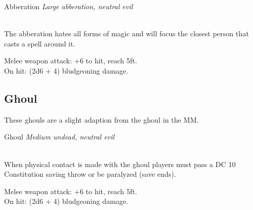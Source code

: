 \documentclass[10pt,twoside,twocolumn]{article}
\begin{document}
\begin{monsterbox}{Abberation}
	\textit{Large abberation, neutral evil}\\
	\hline
	\basics[%
	armorclass = 16,
	hitpoints  = 93 (11d10 + 33),
	speed      = 20 ft
	]
	\hline
	\stats[
	STR = 19 (+4),
	DEX = 10 (0),
	CON = 16 (+3),
	INT = 5 (-3),
	WIS = 11 (0),
	CHA = 5 (-3)
	]
	\hline
	\details[%
	languages = {None},
	]
	\hline \\[1mm]
	\begin{monsteraction}
		The abberation hates all forms of magic and will focus the closest person that casts a spell around it.
	\end{monsteraction}
	\begin{monsteraction}[Tentacles.]
		Melee weapon attack: +6 to hit, reach 5ft. \\
		
		On hit: (2d6 + 4) bludgeoning damage.
	\end{monsteraction}
\end{monsterbox}

\subsection{Ghoul}

These ghouls are a slight adaption from the ghoul in the MM. \\

\begin{monsterbox}{Ghoul}
	\textit{Medium undead, neutral evil}\\
	\hline
	\basics[%
	armorclass = 16,
	hitpoints  = 45 (10d8),
	speed      = 60 ft
	]
	\hline
	\stats[
	STR = 13 (+1),
	DEX = 15 (+2),
	CON = 10 (0),
	INT = 7 (-2),
	WIS = 10 (0),
	CHA = 6 (-2)
	]
	\hline
	\details[%
	languages = {None},
	]
	\hline \\[1mm]
	\begin{monsteraction}
		When physical contact is made with the ghoul players must pass a DC 10 Constitution saving throw or be paralyzed (save ends).
	\end{monsteraction}
	\begin{monsteraction}[Rush.]
		Melee weapon attack: +6 to hit, reach 5ft. \\
		
		On hit: (2d6 + 4) bludgeoning damage.
	\end{monsteraction}
\end{monsterbox}
\end{document}
